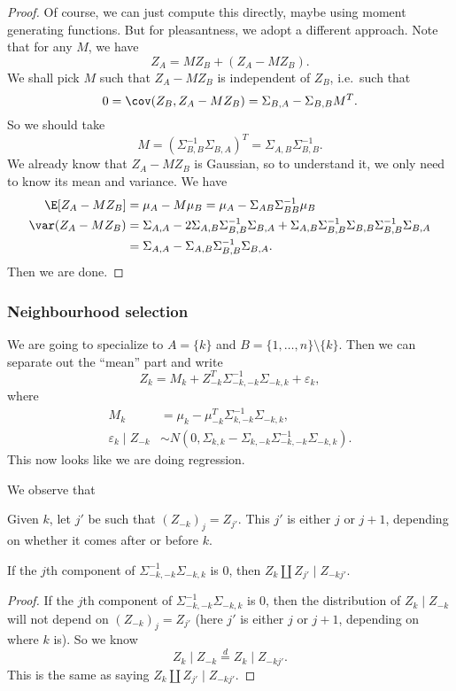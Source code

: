 \documentclass[a4paper]{article}
\begin{document}
\begin{proof}
  Of course, we can just compute this directly, maybe using moment generating functions. But for pleasantness, we adopt a different approach. Note that for any $M$, we have
  \[
    Z_A = M Z_B + (Z_A - M Z_B).
  \]
  We shall pick $M$ such that $Z_A - M Z_B$ is independent of $Z_B$, i.e.\ such that
  \[
    0 = \cov(Z_B, Z_A - M Z_B) = \Sigma_{B,A} - \Sigma_{B, B} M^T.
  \]
  So we should take
  \[
    M = (\Sigma_{B, B}^{-1}\Sigma_{B,A})^T = \Sigma_{A,B} \Sigma_{B,B}^{-1}.
  \]
  We already know that $Z_A - M Z_B$ is Gaussian, so to understand it, we only need to know its mean and variance. We have
  \begin{align*}
    \E[Z_A - M Z_B ] &= \mu_A - M \mu_B = \mu_A - \Sigma_{AB} \Sigma_{BB}^{-1} \mu_B\\
    \var(Z_A - M Z_B) &= \Sigma_{A, A} - 2 \Sigma_{A, B} \Sigma_{B, B}^{-1} \Sigma_{B, A} + \Sigma_{A, B} \Sigma_{B, B}^{-1} \Sigma_{B, B} \Sigma_{B, B}^{-1} \Sigma_{B, A}\\
    &= \Sigma_{A, A} - \Sigma_{A, B} \Sigma_{B, B}^{-1} \Sigma_{B, A}.
  \end{align*}
  Then we are done.
\end{proof}

\subsubsection*{Neighbourhood selection}
We are going to specialize to $A = \{k\}$ and $B = \{1, \ldots, n\} \setminus \{k\}$. Then we can separate out the ``mean'' part and write
\[
  Z_k = M_k + Z_{-k}^T \Sigma_{-k, -k}^{-1} \Sigma_{-k, k} + \varepsilon_k,
\]
where
\begin{align*}
  M_k &= \mu_k - \mu_{-k}^T \Sigma_{k, -k}^{-1} \Sigma_{-k, k},\\
  \varepsilon_k \mid Z_{-k} &\sim N(0, \Sigma_{k, k} - \Sigma_{k, -k} \Sigma_{-k, -k}^{-1} \Sigma_{-k, k}).
\end{align*}
This now looks like we are doing regression.

We observe that
\begin{lemma}
  Given $k$, let $j'$ be such that $(Z_{-k})_j = Z_{j'}$. This $j'$ is either $j$ or $j + 1$, depending on whether it comes after or before $k$.

  If the $j$th component of $\Sigma_{-k, -k}^{-1} \Sigma_{-k, k}$ is $0$, then $Z_k \amalg Z_{j'} \mid Z_{-kj'}$.
\end{lemma}

\begin{proof}
  If the $j$th component of $\Sigma_{-k, -k}^{-1} \Sigma_{-k, k}$ is $0$, then the distribution of $Z_k \mid Z_{-k}$ will not depend on $(Z_{-k})_j = Z_{j'}$ (here $j'$ is either $j$ or $j + 1$, depending on where $k$ is). So we know
  \[
    Z_k \mid Z_{-k} \overset{d}{=} Z_k \mid Z_{-kj'}.
  \]
  This is the same as saying $Z_k \amalg Z_{j'} \mid Z_{-kj'}$.
\end{proof}
\end{document}

